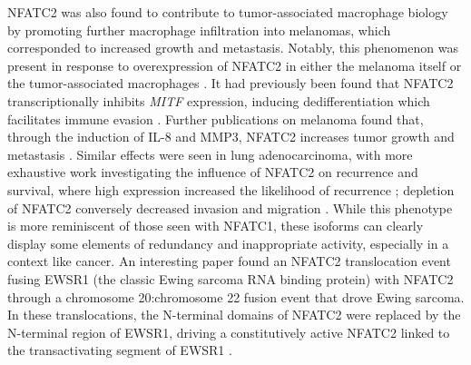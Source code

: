NFATC2 was also found to contribute to tumor\hyp{}associated macrophage biology by promoting further macrophage infiltration into melanomas, which corresponded to increased growth and metastasis. Notably, this phenomenon was present in response to overexpression of NFATC2 in either the melanoma itself or the tumor\hyp{}associated macrophages \citep{Liu2018}. It had previously been found that NFATC2 transcriptionally inhibits \textit{MITF} expression, inducing dedifferentiation which facilitates immune evasion \citep{Perotti2016}. Further publications on melanoma found that, through the induction of IL\hyp{}8 and MMP3, NFATC2 increases tumor growth and metastasis \citep{Shoshan2016}. Similar effects were seen in lung adenocarcinoma, with more exhaustive work investigating the influence of NFATC2 on recurrence and survival, where high expression increased the likelihood of recurrence \citep{Xiao2017}; depletion of NFATC2 conversely decreased invasion and migration \citep{Liu2013}. While this phenotype is more reminiscent of those seen with NFATC1, these isoforms can clearly display some elements of redundancy and inappropriate activity, especially in a context like cancer. An interesting paper found an NFATC2 translocation event fusing EWSR1 (the classic Ewing sarcoma RNA binding protein) with NFATC2 through a chromosome 20:chromosome 22 fusion event that drove Ewing sarcoma. In these translocations, the N\hyp{}terminal domains of NFATC2 were replaced by the N\hyp{}terminal region of EWSR1, driving a constitutively active NFATC2 linked to the transactivating segment of EWSR1 \citep{Szuhai2009}. 

